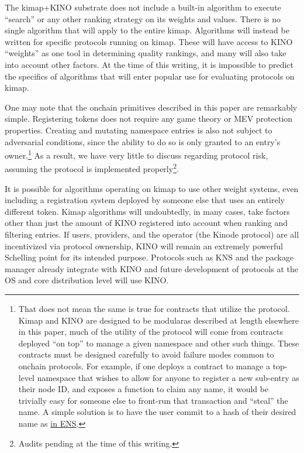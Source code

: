 \documentclass[runningheads]{llncs}
\begin{document}
The kimap+KINO substrate does not include a built-in algorithm to execute ``search'' or any other ranking strategy on its weights and values.
There is no single algorithm that will apply to the entire kimap.
Algorithms will instead be written for specific protocols running on kimap.
These will have access to KINO ``weights'' as one tool in determining quality rankings, and many will also take into account other factors.
At the time of this writing, it is impossible to predict the specifics of algorithms that will enter popular use for evaluating protocols on kimap.

One may note that the onchain primitives described in this paper are remarkably simple.
Registering tokens does not require any game theory or MEV protection properties.
Creating and mutating namespace entries is also not subject to adversarial conditions, since the ability to do so is only granted to an entry's owner.\footnote{That does not mean the same is true for contracts that utilize the protocol.
Kimap and KINO are designed to be modular\textemdash as described at length elsewhere in this paper, much of the utility of the protocol will come from contracts deployed ``on top'' to manage a given namespace and other such things.
These contracts must be designed carefully to avoid failure modes common to onchain protocols.
For example, if one deploys a contract to manage a top-level namespace that wishes to allow for anyone to register a new sub-entry as their node ID, and exposes a function to claim any name, it would be trivially easy for someone else to front-run that transaction and ``steal'' the name.
A simple solution is to have the user commit to a hash of their desired name as \href{https://docs.ens.domains/registry/eth\#commit-reveal}{in ENS}.}
As a result, we have very little to discuss regarding protocol risk, assuming the protocol is implemented properly\footnote{Audits pending at the time of this writing.}.

It is possible for algorithms operating on kimap to use other weight systems, even including a registration system deployed by someone else that uses an entirely different token.
Kimap algorithms will undoubtedly, in many cases, take factors other than just the amount of KINO registered into account when ranking and filtering entries.
If users, providers, and the operator (the Kinode protocol) are all incentivized via protocol ownership, KINO will remain an extremely powerful Schelling point for its intended purpose.
Protocols such as KNS and the package manager already integrate with KINO and future development of protocols at the OS and core distribution level will use KINO.
\end{document}
